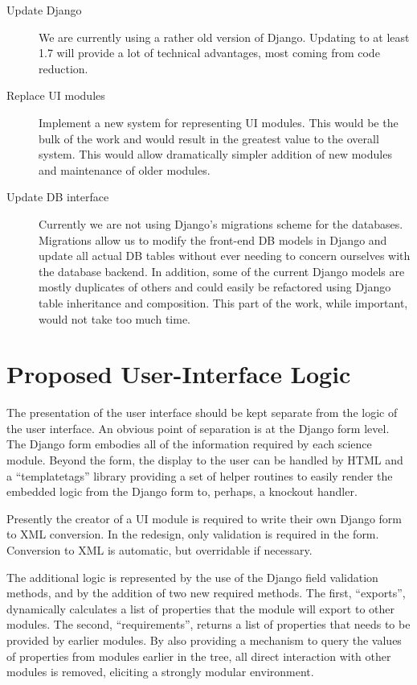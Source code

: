 \documentclass[12pt]{scrartcl}
\begin{document}
\begin{description}
\item[Update Django] We are currently using a rather old version of Django. Updating to at least
  1.7 will provide a lot of technical advantages, most coming from code reduction.
\item[Replace UI modules] Implement a new system for representing UI modules. This would be the
  bulk of the work and would result in the greatest value to the overall system. This would allow
  dramatically simpler addition of new modules and maintenance of older modules.
\item[Update DB interface] Currently we are not using Django's migrations scheme for the databases.
  Migrations allow us to modify the front-end DB models in Django and update all actual DB tables
  without ever needing to concern ourselves with the database backend. In addition, some of
  the current Django models are mostly duplicates of others and could easily be refactored using
  Django table inheritance and composition. This part of the work, while important, would not take
  too much time.
\end{description}

\section{Proposed User-Interface Logic}

The presentation of the user interface should be kept separate from the logic of the user
interface. An obvious point of separation is at the Django form level. The Django form embodies
all of the information required by each science module. Beyond the form, the display to the
user can be handled by HTML and a ``templatetags'' library providing a set of helper routines
to easily render the embedded logic from the Django form to, perhaps, a knockout handler.

Presently the creator of a UI module is required to write their own Django form to XML conversion.
In the redesign, only validation is required in the form. Conversion to XML is automatic, but
overridable if necessary.

The additional logic is represented by the use of the Django field validation methods, and by
the addition of two new required methods. The first, ``exports'', dynamically calculates a list
of properties that the module will export to other modules. The second, ``requirements'', returns
a list of properties that needs to be provided by earlier modules. By also providing a mechanism
to query the values of properties from modules earlier in the tree, all direct interaction with
other modules is removed, eliciting a strongly modular environment.
\end{document}
